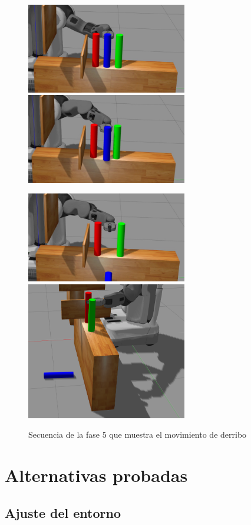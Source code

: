 \documentclass[12pt,spanish,chapterprefix, numbers=noenddot]{book}
\numberwithin{equation}{section}
\numberwithin{figure}{section}
\begin{document}
\begin{figure}[hbt!]
\centering
\includegraphics[width=7cm]{Figs/fase5_1.png}
\includegraphics[width=7cm]{Figs/fase5_2.png}
\par
\centering
\includegraphics[width=7cm]{Figs/fase5_3.png}
\includegraphics[width=7cm]{Figs/pose2_2.png}
\par
\caption{\label{fig:fase5}Secuencia de la fase 5 que muestra el movimiento de derribo}
\end{figure}

\section{Alternativas probadas}
\subsection{Ajuste del entorno}
\end{document}
